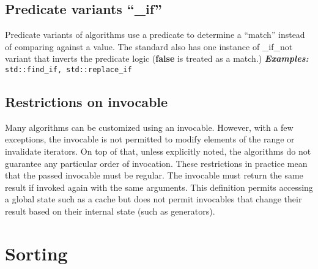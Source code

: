\documentclass{report}
\begin{document}
\subsection{Predicate variants ``\_if''}
Predicate variants of algorithms use a predicate to determine a ``match'' instead of comparing against a value. The standard also has one instance of \_if\_not variant that inverts the predicate logic (\textbf{false} is treated as a match.) 
\bigbreak\noindent
\textbf{\textit{Examples:}} \texttt{std::find\_if, std::replace\_if}
\subsection{Restrictions on invocable}
Many algorithms can be customized using an invocable. However, with a few exceptions, the invocable is not permitted to modify elements of the range or invalidate iterators. On top of that, unless explicitly noted, the algorithms do not guarantee any particular order of invocation.
\bigbreak \noindent
These restrictions in practice mean that the passed invocable must be regular. The invocable must return the same result if invoked again with the same arguments. This definition permits accessing a global state such as a cache but does not permit invocables that change their result based on their internal state (such as generators).

\section{Sorting}
\end{document}
